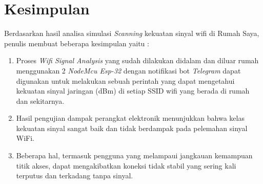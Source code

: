 \documentclass[conference]{IEEEtran}
\begin{document}
\section{Kesimpulan}

Berdasarkan hasil analisa simulasi \textit{Scanning} kekuatan sinyal wifi di Rumah Saya, penulis membuat beberapa kesimpulan yaitu :
\begin{enumerate}
    \item Proses \textit{Wifi Signal Analysis} yang sudah dilakukan didalam dan diluar rumah  menggunakan 2 \textit{NodeMcu Esp-32} dengan notifikasi bot \textit{Telegram} dapat digunakan untuk melakukan sebuah perintah yang dapat mengetahui kekuatan sinyal jaringan (dBm)
    di setiap SSID wifi yang berada di rumah dan sekitarnya.
    \item Hasil pengujian dampak perangkat elektronik menunjukkan bahwa kelas kekuatan sinyal sangat baik dan tidak berdampak pada pelemahan sinyal WiFi.
   \item Beberapa hal, termasuk pengguna yang melampaui jangkauan kemampuan titik akses, dapat mengakibatkan koneksi tidak stabil yang sering kali terputus dan terkadang tanpa sinyal.
\end{enumerate}
\end{document}

